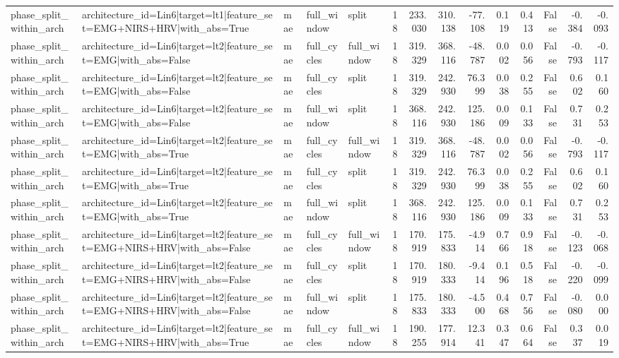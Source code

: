 \begin{table}
\begin{tabular}{lllllrrrrrrrrr}
phase_split_within_arch & architecture_id=Lin6|target=lt1|feature_set=EMG+NIRS+HRV|with_abs=True & mae & full_window & split & 18 & 233.030 & 310.138 & -77.108 & 0.119 & 0.413 & False & -0.384 & -0.093 \\
phase_split_within_arch & architecture_id=Lin6|target=lt2|feature_set=EMG|with_abs=False & mae & full_cycles & full_window & 18 & 319.329 & 368.116 & -48.787 & 0.002 & 0.056 & False & -0.793 & -0.117 \\
phase_split_within_arch & architecture_id=Lin6|target=lt2|feature_set=EMG|with_abs=False & mae & full_cycles & split & 18 & 319.329 & 242.930 & 76.399 & 0.038 & 0.255 & False & 0.602 & 0.160 \\
phase_split_within_arch & architecture_id=Lin6|target=lt2|feature_set=EMG|with_abs=False & mae & full_window & split & 18 & 368.116 & 242.930 & 125.186 & 0.009 & 0.133 & False & 0.731 & 0.253 \\
phase_split_within_arch & architecture_id=Lin6|target=lt2|feature_set=EMG|with_abs=True & mae & full_cycles & full_window & 18 & 319.329 & 368.116 & -48.787 & 0.002 & 0.056 & False & -0.793 & -0.117 \\
phase_split_within_arch & architecture_id=Lin6|target=lt2|feature_set=EMG|with_abs=True & mae & full_cycles & split & 18 & 319.329 & 242.930 & 76.399 & 0.038 & 0.255 & False & 0.602 & 0.160 \\
phase_split_within_arch & architecture_id=Lin6|target=lt2|feature_set=EMG|with_abs=True & mae & full_window & split & 18 & 368.116 & 242.930 & 125.186 & 0.009 & 0.133 & False & 0.731 & 0.253 \\
phase_split_within_arch & architecture_id=Lin6|target=lt2|feature_set=EMG+NIRS+HRV|with_abs=False & mae & full_cycles & full_window & 18 & 170.919 & 175.833 & -4.914 & 0.766 & 0.918 & False & -0.123 & -0.068 \\
phase_split_within_arch & architecture_id=Lin6|target=lt2|feature_set=EMG+NIRS+HRV|with_abs=False & mae & full_cycles & split & 18 & 170.919 & 180.333 & -9.414 & 0.196 & 0.518 & False & -0.220 & -0.099 \\
phase_split_within_arch & architecture_id=Lin6|target=lt2|feature_set=EMG+NIRS+HRV|with_abs=False & mae & full_window & split & 18 & 175.833 & 180.333 & -4.500 & 0.468 & 0.756 & False & -0.080 & 0.000 \\
phase_split_within_arch & architecture_id=Lin6|target=lt2|feature_set=EMG+NIRS+HRV|with_abs=True & mae & full_cycles & full_window & 18 & 190.255 & 177.914 & 12.341 & 0.347 & 0.664 & False & 0.337 & 0.019 \\

\end{tabular}
\end{table}
